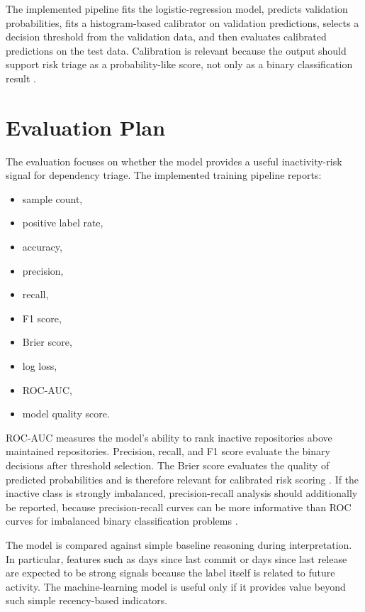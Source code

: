 The implemented pipeline fits the logistic-regression model, predicts validation probabilities, fits a histogram-based calibrator on validation predictions, selects a decision threshold from the validation data, and then evaluates calibrated predictions on the test data. Calibration is relevant because the output should support risk triage as a probability-like score, not only as a binary classification result \cite{niculescu2005probabilities}.

\section{Evaluation Plan}
\label{sec:method-evaluation-plan}

The evaluation focuses on whether the model provides a useful inactivity-risk signal for dependency triage. The implemented training pipeline reports:

\begin{itemize}
    \item sample count,
    \item positive label rate,
    \item accuracy,
    \item precision,
    \item recall,
    \item F1 score,
    \item Brier score,
    \item log loss,
    \item ROC-AUC,
    \item model quality score.
\end{itemize}

ROC-AUC measures the model's ability to rank inactive repositories above maintained repositories. Precision, recall, and F1 score evaluate the binary decisions after threshold selection. The Brier score evaluates the quality of predicted probabilities and is therefore relevant for calibrated risk scoring \cite{niculescu2005probabilities}. If the inactive class is strongly imbalanced, precision-recall analysis should additionally be reported, because precision-recall curves can be more informative than ROC curves for imbalanced binary classification problems \cite{saito2015precision}.

The model is compared against simple baseline reasoning during interpretation. In particular, features such as days since last commit or days since last release are expected to be strong signals because the label itself is related to future activity. The machine-learning model is useful only if it provides value beyond such simple recency-based indicators.

